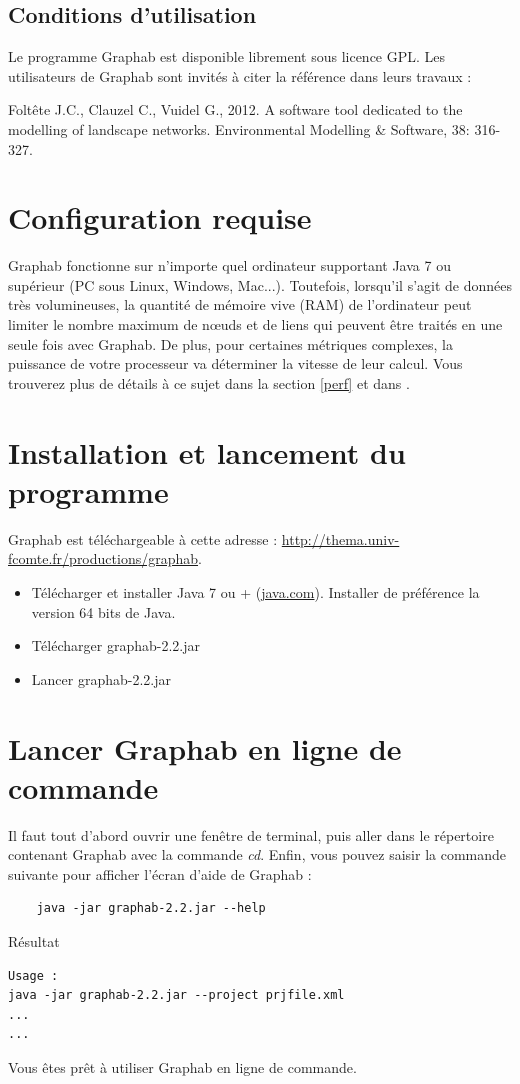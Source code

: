 \documentclass[a4paper,10pt]{report}
\begin{document}
\subsection{Conditions d’utilisation}
Le programme Graphab est disponible librement sous licence GPL. Les utilisateurs de Graphab sont invités à citer la référence \cite{2012_graphab_EMS} dans leurs travaux :

Foltête J.C., Clauzel C., Vuidel G., 2012. A software tool dedicated to the modelling of landscape networks. Environmental Modelling \& Software, 38: 316-327.


\section{Configuration requise}

Graphab fonctionne sur n'importe quel ordinateur supportant Java 7 ou supérieur (PC sous Linux, Windows, Mac...). Toutefois, lorsqu'il s'agit de données très volumineuses, la quantité de mémoire vive (RAM) de l’ordinateur peut limiter le nombre maximum de nœuds et de liens qui peuvent être traités en une seule fois avec Graphab. De plus, pour certaines métriques complexes, la puissance de votre processeur va déterminer la vitesse de leur calcul. Vous trouverez plus de détails à ce sujet dans la section \ref{perf} et dans \cite{2012_graphab_EMS}.

\section{Installation et lancement du programme}

Graphab est téléchargeable à cette adresse : \url{http://thema.univ-fcomte.fr/productions/graphab}.

\begin{itemize}
	\item Télécharger et installer Java 7 ou + (\href{http://www.java.com}{java.com}). Installer de préférence la version 64 bits de Java.
	\item Télécharger graphab-2.2.jar
	\item Lancer graphab-2.2.jar
\end{itemize}

\section{Lancer Graphab en ligne de commande}
Il faut tout d'abord ouvrir une fenêtre de terminal, puis aller dans le répertoire contenant Graphab avec la commande \textit{cd}.
Enfin, vous pouvez saisir la commande suivante pour afficher l'écran d'aide de Graphab :
\begin{Verbatim}
	java -jar graphab-2.2.jar --help
\end{Verbatim}
Résultat
\begin{Verbatim}
Usage :
java -jar graphab-2.2.jar --project prjfile.xml
...
...
\end{Verbatim}
Vous êtes prêt à utiliser Graphab en ligne de commande.
\end{document}
